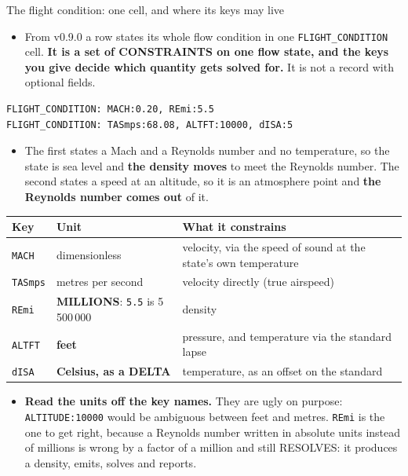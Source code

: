\documentclass[aspectratio=169,10pt]{beamer}
\newcommand{\code}[1]{\texttt{\small #1}}
\begin{document}
\begin{frame}{The flight condition: one cell, and where its keys may live}
  \small
  \begin{itemize}
    \item From v0.9.0 a row states its whole flow condition in one \code{FLIGHT\_CONDITION} cell. \textbf{It is a set of CONSTRAINTS on one flow state, and the keys you give decide which quantity gets solved for.} It is not a record with optional fields.
  \end{itemize}
\begin{lstlisting}
FLIGHT_CONDITION: MACH:0.20, REmi:5.5
FLIGHT_CONDITION: TASmps:68.08, ALTFT:10000, dISA:5
\end{lstlisting}
  \begin{itemize}
    \item The first states a Mach and a Reynolds number and no temperature, so the state is sea level and \textbf{the density moves} to meet the Reynolds number. The second states a speed at an altitude, so it is an atmosphere point and \textbf{the Reynolds number comes out} of it.
  \end{itemize}
  \begin{center}
  \begin{tabular}{llp{5.6cm}}
    \textbf{Key} & \textbf{Unit} & \textbf{What it constrains} \\
    \hline
    \code{MACH} & dimensionless & velocity, via the speed of sound at the state's own temperature \\
    \code{TASmps} & metres per second & velocity directly (true airspeed) \\
    \code{REmi} & \textbf{MILLIONS}: \code{5.5} is 5\,500\,000 & density \\
    \code{ALTFT} & \textbf{feet} & pressure, and temperature via the standard lapse \\
    \code{dISA} & \textbf{Celsius, as a DELTA} & temperature, as an offset on the standard \\
  \end{tabular}
  \end{center}
  \begin{itemize}
    \item \textbf{Read the units off the key names.} They are ugly on purpose: \code{ALTITUDE:10000} would be ambiguous between feet and metres. \code{REmi} is the one to get right, because a Reynolds number written in absolute units instead of millions is wrong by a factor of a million and still RESOLVES: it produces a density, emits, solves and reports.

\end{itemize}
\end{frame}
\end{document}
